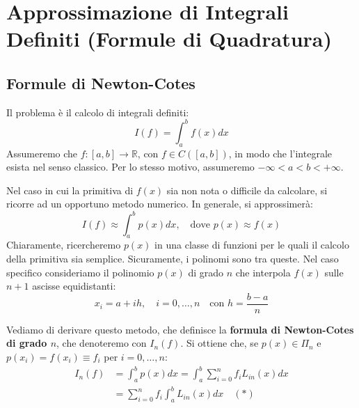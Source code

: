 \newpage
\section{Approssimazione di Integrali Definiti (Formule di Quadratura)}
\subsection{Formule di Newton-Cotes}
Il problema è il calcolo di integrali definiti:
\begin{equation}
I(f) = \int_{a}^{b} f(x) dx
\end{equation}
Assumeremo che $f \colon [a,b] \to \mathbb{R}$, con $f \in C([a,b])$, in modo che l'integrale esista nel senso classico. Per lo stesso motivo, assumeremo $-\infty < a < b < +\infty$.

Nel caso in cui la primitiva di $f(x)$ sia non nota o difficile da calcolare, si ricorre ad un opportuno metodo numerico. In generale, si approssimerà:
\begin{equation}
I(f) \approx \int_{a}^{b} p(x) dx, \quad \text{dove } p(x) \approx f(x)
\end{equation}
Chiaramente, ricercheremo $p(x)$ in una classe di funzioni per le quali il calcolo della primitiva sia semplice. Sicuramente, i polinomi sono tra queste. 
Nel caso specifico consideriamo il polinomio $p(x)$ di grado $n$ che interpola $f(x)$ sulle $n+1$ ascisse equidistanti:
\begin{equation} \label{eq:nodi_equidistanti}
x_i = a + ih, \quad i=0, \dots, n \quad \text{con } h = \frac{b-a}{n}
\end{equation}

Vediamo di derivare questo metodo, che definisce la \textbf{formula di Newton-Cotes di grado $n$}, che denoteremo con $I_n(f)$.
Si ottiene che, se $p(x) \in \Pi_n$ e $p(x_i) = f(x_i) \equiv f_i$ per $i=0, \dots, n$:
\begin{align*}
I_n(f) &= \int_{a}^{b} p(x) dx = \int_{a}^{b} \sum_{i=0}^{n} f_i L_{in}(x) dx \\
&= \sum_{i=0}^{n} f_i \int_{a}^{b} L_{in}(x) dx \quad (*)
\end{align*}

